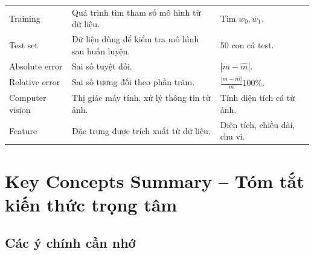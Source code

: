 \begin{longtable}{p{}p{}p{}}
Training & Quá trình tìm tham số mô hình từ dữ liệu. & Tìm $w_0,w_1$. \\

Test set & Dữ liệu dùng để kiểm tra mô hình sau huấn luyện. & 50 con cá test. \\

Absolute error & Sai số tuyệt đối. & $|m-\hat{m}|$. \\

Relative error & Sai số tương đối theo phần trăm. & $\frac{|m-\hat{m}|}{m}100\%$. \\

Computer vision & Thị giác máy tính, xử lý thông tin từ ảnh. & Tính diện tích cá từ ảnh. \\

Feature & Đặc trưng được trích xuất từ dữ liệu. & Diện tích, chiều dài, chu vi. \\

\bottomrule
\end{longtable}
\normalsize

\section{Key Concepts Summary -- Tóm tắt kiến thức trọng tâm}

\subsection{Các ý chính cần nhớ}

